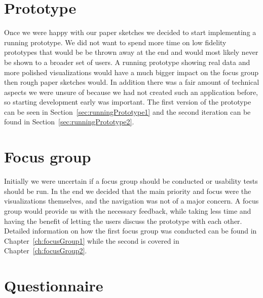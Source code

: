 \section{Prototype}
Once we were happy with our paper sketches we decided to start implementing a running prototype. We did not want to spend more time on low fidelity prototypes that would be be thrown away at the end and would most likely never be shown to a broader set of users. A running prototype showing real data and more polished visualizations would have a much bigger impact on the focus group then rough paper sketches would. In addition there was a fair amount of technical aspects we were unsure of because we had not created such an application before, so starting development early was important. The first version of the prototype can be seen in Section~\ref{sec:runningPrototype1} and the second iteration can be found in Section~\ref{sec:runningPrototype2}.

\section{Focus group}
Initially we were uncertain if a focus group should be conducted or usability tests should be run. In the end we decided that the main priority and focus were the visualizations themselves, and the navigation was not of a major concern. A focus group would provide us with the necessary feedback, while taking less time and having the benefit of letting the users discuss the prototype with each other. Detailed information on how the first focus group was conducted can be found in Chapter~\ref{ch:focusGroup1} while the second is covered in Chapter~\ref{ch:focusGroup2}.

\section{Questionnaire}

